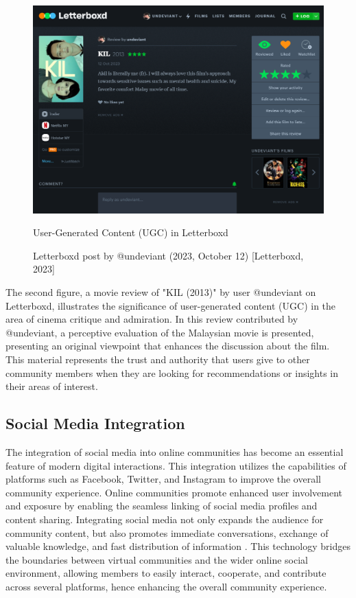 \begin{figure}[h]
    \centering
    \includegraphics[width=0.8\linewidth]{mainmatter/images/ugc2.png}
    \caption{User-Generated Content (UGC) in Letterboxd}
    \caption*{Letterboxd post by @undeviant (2023, October 12) [Letterboxd, 2023]}
    \label{fig:myfig2}
\end{figure}
The second figure, a movie review of "KIL (2013)" by user @undeviant on Letterboxd, illustrates the significance of user-generated content (UGC) in the area of cinema critique and admiration. In this review contributed by @undeviant, a perceptive evaluation of the Malaysian movie is presented, presenting an original viewpoint that enhances the discussion about the film. This material represents the trust and authority that users give to other community members when they are looking for recommendations or insights in their areas of interest.

\subsection{Social Media Integration}
The integration of social media into online communities has become an essential feature of modern digital interactions. This integration utilizes the capabilities of platforms such as Facebook, Twitter, and Instagram to improve the overall community experience. Online communities promote enhanced user involvement and exposure by enabling the seamless linking of social media profiles and content sharing. Integrating social media not only expands the audience for community content, but also promotes immediate conversations, exchange of valuable knowledge, and fast distribution of information \parencite{zanuar22}. This technology bridges the boundaries between virtual communities and the wider online social environment, allowing members to easily interact, cooperate, and contribute across several platforms, hence enhancing the overall community experience.

